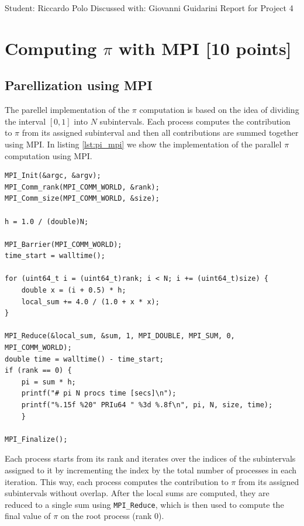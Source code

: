 \documentclass[unicode,10pt,a4paper,oneside,numbers=endperiod,openany]{scrartcl}
\begin{document}
\setassignment
{}

            {Student: Riccardo Polo}
            {Discussed with: Giovanni Guidarini}
            {Report for Project 4}{}
\newline

\assignmentpolicy

\newpage
\section{Computing $\pi$ with MPI [10 points]}
%
\subsection{Parellization using MPI}
The parellel implementation of the $\pi$ computation is based on the idea of dividing the interval $[0, 1]$ into $N$ subintervals. Each process computes the contribution to $\pi$ from its assigned subinterval and then all contributions are summed together using MPI. In listing \ref{lst:pi_mpi} we show the implementation of the parallel $\pi$ computation using MPI.

\begin{lstlisting}[style=grayverbatim, caption={Parallel $\pi$ computation using MPI}, label={lst:pi_mpi}]
MPI_Init(&argc, &argv);
MPI_Comm_rank(MPI_COMM_WORLD, &rank);
MPI_Comm_size(MPI_COMM_WORLD, &size);

h = 1.0 / (double)N;

MPI_Barrier(MPI_COMM_WORLD);
time_start = walltime();

for (uint64_t i = (uint64_t)rank; i < N; i += (uint64_t)size) {
    double x = (i + 0.5) * h;
    local_sum += 4.0 / (1.0 + x * x);
}

MPI_Reduce(&local_sum, &sum, 1, MPI_DOUBLE, MPI_SUM, 0, MPI_COMM_WORLD);
double time = walltime() - time_start;
if (rank == 0) {
    pi = sum * h;
    printf("# pi N procs time [secs]\n");
    printf("%.15f %20" PRIu64 " %3d %.8f\n", pi, N, size, time);
    }

MPI_Finalize();
\end{lstlisting}
Each process starts from its rank and iterates over the indices of the subintervals assigned to it by incrementing the index by the total number of processes in each iteration. This way, each process computes the contribution to $\pi$ from its assigned subintervals without overlap. After the local sums are computed, they are reduced to a single sum using \texttt{MPI\_Reduce}, which is then used to compute the final value of $\pi$ on the root process (rank 0).
\end{document}
